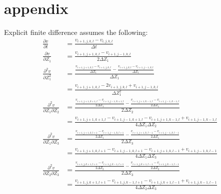 \documentclass[10pt,a4paper]{article}
\begin{document}
\section{appendix}
Explicit finite difference assumes the following:
\begin{align}
\frac{{\partial v}}{{\partial t}} &= \frac{{{v_{i + 1,j,k,l}} - {v_{i,j,k,l}}}}{{\Delta t}}\\
\frac{{\partial v}}{{\partial {Z_1}}} &= \frac{{{v_{i + 1,j + 1,k,l}} - {v_{i + 1,j - 1,k,l}}}}{{2\Delta {Z_1}}}\\
\frac{{{\partial ^2}v}}{{\partial Z_1^2}} &= \frac{{\frac{{{v_{i + 1,j + 1,k,l}} - {v_{i + 1,j,k,l}}}}{{\Delta {Z_1}}} - \frac{{{v_{i + 1,j,k,l}} - {v_{i + 1,j - 1,k,l}}}}{{\Delta {Z_1}}}}}{{\Delta {Z_1}}} \\
&= \frac{{{v_{i + 1,j + 1,k,l}} - 2{v_{i + 1,j,k,l}} + {v_{i + 1,j - 1,k,l}}}}{{\Delta Z_1^2}}\\
\frac{{{\partial ^2}v}}{{\partial {Z_1}\partial {Z_2}}} &= \frac{{\frac{{{v_{i + 1,j + 1,k + 1,l}} - {v_{i + 1,j - 1,k + 1,l}}}}{{2\Delta {Z_1}}} - \frac{{{v_{i + 1,j + 1,k - 1,l}} - {v_{i + 1,j - 1,k - 1,l}}}}{{2\Delta {Z_1}}}}}{{2\Delta {Z_2}}} \\
&= \frac{{{v_{i + 1,j + 1,k + 1,l}} - {v_{i + 1,j - 1,k + 1,l}} - {v_{i + 1,j + 1,k - 1,l}} + {v_{i + 1,j - 1,k - 1,l}}}}{{4\Delta {Z_1}\Delta {Z_2}}}\\
\frac{{{\partial ^2}v}}{{\partial {Z_1}\partial {Z_3}}} &= \frac{{\frac{{{v_{i + 1,j + 1,k,l + 1}} - {v_{i + 1,j - 1,k,l + 1}}}}{{2\Delta {Z_1}}} - \frac{{{v_{i + 1,j + 1,k,l - 1}} - {v_{i + 1,j - 1,k,l - 1}}}}{{2\Delta {Z_1}}}}}{{2\Delta {Z_3}}} \\
&= \frac{{{v_{i + 1,j + 1,k,l + 1}} - {v_{i + 1,j - 1,k,l + 1}} - {v_{i + 1,j + 1,k,l - 1}} + {v_{i + 1,j - 1,k,l - 1}}}}{{4\Delta {Z_1}\Delta {Z_3}}}\\
\frac{{{\partial ^2}v}}{{\partial {Z_2}\partial {Z_3}}} &= \frac{{\frac{{{v_{i + 1,j,k + 1,l + 1}} - {v_{i + 1,j,k - 1,l + 1}}}}{{2\Delta {Z_2}}} - \frac{{{v_{i + 1,j,k + 1,l - 1}} - {v_{i + 1,j,k - 1,l - 1}}}}{{2\Delta {Z_2}}}}}{{2\Delta {Z_3}}} \\
&= \frac{{{v_{i + 1,j,k + 1,l + 1}} - {v_{i + 1,j,k - 1,l + 1}} - {v_{i + 1,j,k + 1,l - 1}} + {v_{i + 1,j,k - 1,l - 1}}}}{{4\Delta {Z_2}\Delta {Z_3}}}
\end{align}
\end{document}
